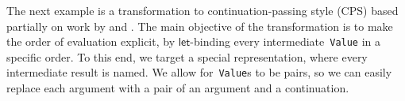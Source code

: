 \documentclass[9pt,authoryear]{sigplanconf}
\begin{document}
%
The next example is a transformation to continuation-passing
    style (CPS) based partially on work by \citet{chlipala_parametric_2008} and
    \citet{guillemette_type-preserving_2008}.
    The main objective of the transformation is to make the
    order of evaluation explicit, by $ \mathsf{let} $-binding every intermediate{~}\texttt{Value} in
    a specific order. To this end, we target a special representation,
    where every intermediate result is named. We allow for{~}\texttt{Value}s to be
    pairs, so we can easily replace each argument with a pair of an
    argument and a continuation.%


{\nopagebreak }

%
%
%
%
\end{document}

